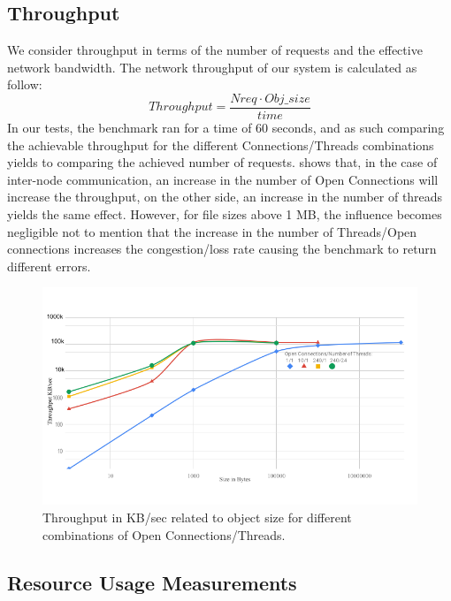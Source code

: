 \documentclass[runningheads]{llncs}
\begin{document}
\subsection{Throughput}
We consider throughput in terms of the number of requests and the effective network bandwidth. The network throughput of our system is calculated as follow:
\[Throughput=\frac{Nreq \cdot Obj\_size}{time}\]
In our tests, the benchmark ran for a time of 60 seconds, and as such comparing the achievable throughput for the different Connections/Threads combinations yields to comparing the achieved number of requests.  shows that, in the case of inter-node communication, an increase in the number of Open Connections will increase the throughput, on the other side, an increase in the number of threads yields the same effect. However, for file sizes above 1 MB, the influence becomes negligible not to mention that the increase in the number of Threads/Open connections increases the congestion/loss rate causing the benchmark to return different errors.
\begin{figure}
\includegraphics[width=1.0\textwidth]{throughput-to-size.png}
\caption{Throughput in KB/sec related to object size for different combinations of Open Connections/Threads.}
\label{fig:throughput-to-size}
\end{figure}

\subsection{Resource Usage Measurements}
\end{document}
